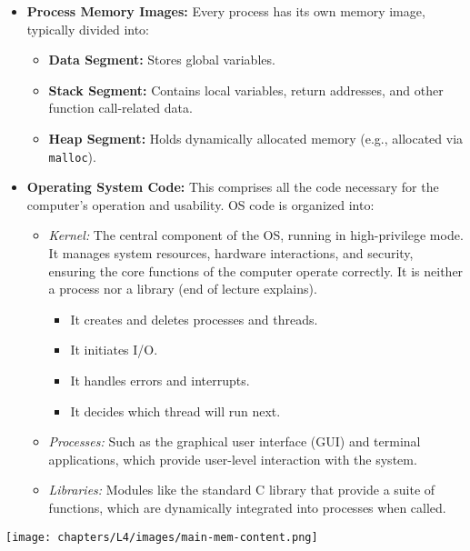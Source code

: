 \documentclass[../../compsys.tex]{subfiles}
\begin{document}
\begin{itemize}
  \item \textbf{Process Memory Images:} Every process has its own memory image, typically divided into:
  \begin{itemize}
    \item \textbf{Data Segment:} Stores global variables.
    \item \textbf{Stack Segment:} Contains local variables, return addresses, and other function call-related data.
    \item \textbf{Heap Segment:} Holds dynamically allocated memory (e.g., allocated via \texttt{malloc}).
  \end{itemize}
  \vspace{5px} 
  \item \textbf{Operating System Code:} This comprises all the code necessary for the computer's operation and usability. OS code is organized into:
    \begin{itemize}
      \item \emph{Kernel:} The central component of the OS, running in high-privilege mode. It manages system resources, hardware interactions, and security, ensuring the core functions of the computer operate correctly. It is neither a process nor a library (end of lecture explains).
        \begin{itemize}
          \item It creates and deletes processes and threads.
          \item It initiates I/O.
          \item It handles errors and interrupts.
          \item It decides which thread will run next.
        \end{itemize}
      \item \emph{Processes:} Such as the graphical user interface (GUI) and terminal applications, which provide user-level interaction with the system.
      \item \emph{Libraries:} Modules like the standard C library that provide a suite of functions, which are dynamically integrated into processes when called.
    \end{itemize}
\end{itemize}

\begin{center}
  \texttt{[image: chapters/L4/images/main-mem-content.png]}
\end{center}
\newpage
\end{document}
